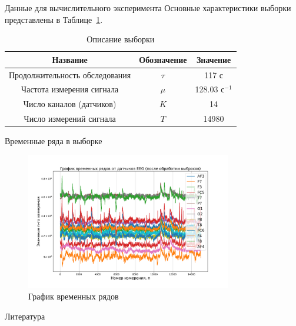 \documentclass[9pt,pdf]{beamer} %
\begin{document}
\begin{frame}{Данные для вычислительного эксперимента}
Основные характеристики выборки представлены в
Таблице~\ref{table:sample}.

\begin{table}
	\centering
	\caption{Описание выборки}
	\begin{tabular}{|c|c|c|}
		\hline
		Название                       & Обозначение & Значение             \\
		\hline \hline
		Продолжительность обследования & $\tau$         & 117 с                \\ \hline
		Частота измерения сигнала      & $\mu$       & 128.03 $\text{с}^{-1}$   \\ \hline
	    Число каналов (датчиков)    & $K$   & 14          \\ \hline
		Число измерений сигнала             & $T$  & 14980           \\ \hline
	\end{tabular}
	\label{table:sample}
\end{table}



\end{frame}
\begin{frame}{Временные ряда в выборке}

\begin{figure}[h]
	\centering
	\includegraphics[width=0.8\textwidth]{Dataset.pdf}
	\caption{График временных рядов}
	\label{fig:2}
\end{figure}

\end{frame}


\begin{frame}{Литература}
\nocite{barachant2010riemannian, misc_eeg_eye_state_264, congedo2013new}


\end{frame}
\end{document}
